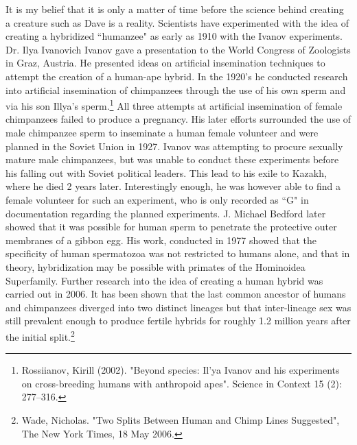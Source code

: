\documentclass[letterpaper,10pt,twoside]{article}
\begin{document}
It is my belief that it is only a matter of time before the science behind creating a creature such as Dave is a reality.  Scientists have experimented with the idea of creating a hybridized ``humanzee" as early as 1910 with the Ivanov experiments.  Dr. Ilya Ivanovich Ivanov gave a presentation to the World Congress of Zoologists in Graz, Austria.  He presented ideas on artificial insemination techniques to attempt the creation of a human-ape hybrid.  In the 1920's he conducted research into artificial insemination of chimpanzees through the use of his own sperm and via his son Illya's sperm.\footnote{Rossiianov, Kirill (2002). "Beyond species: Il'ya Ivanov and his experiments on cross-breeding humans with anthropoid apes". Science in Context 15 (2): 277–316.}  All three attempts at artificial insemination of female chimpanzees failed to produce a pregnancy.  His later efforts surrounded the use of male chimpanzee sperm to inseminate a human female volunteer and were planned in the Soviet Union in 1927.  Ivanov was attempting to procure sexually mature male chimpanzees, but was unable to conduct these experiments before his falling out with Soviet political leaders. This lead to his exile to Kazakh, where he died 2 years later.  Interestingly enough, he was however able to find a female volunteer for such an experiment, who is only recorded as ``G" in documentation regarding the planned experiments.  J. Michael Bedford later showed that it was possible for human sperm to penetrate the protective outer membranes of a gibbon egg.  His work, conducted in 1977 showed that the specificity of human spermatozoa was not restricted to humans alone, and that in theory, hybridization may be possible with primates of the Hominoidea Superfamily.  Further research into the idea of creating a human hybrid was carried out in 2006.  It has been shown that the last common ancestor of humans and chimpanzees diverged  into two distinct lineages but that inter-lineage sex was still prevalent enough to produce fertile hybrids for roughly 1.2 million years after the initial split.\footnote{Wade, Nicholas. "Two Splits Between Human and Chimp Lines Suggested", The New York Times, 18 May 2006.}
\end{document}
